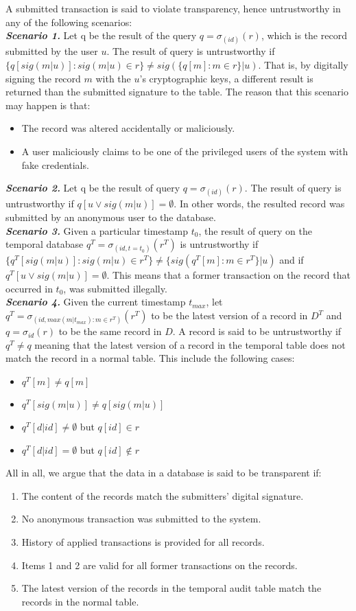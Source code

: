 A submitted transaction is said to violate transparency, hence untrustworthy in any of the following scenarios:\\
\textbf{\emph{Scenario 1.}} Let q be the result of the query $q=\sigma_{(id)}(r)$, which is the record submitted by the user $u$. The result of query is untrustworthy if $\{q[sig(m|u)]: sig(m|u) \in r\} \neq sig(\{q[m]: m \in r \} |u)$. That is, by digitally signing the record $m$ with the $u$'s cryptographic keys, a different result is returned than the submitted signature to the table. The reason that this scenario may happen is that: 
\begin{itemize}
	\item  The record was altered accidentally or maliciously.
	\item  A user maliciously claims to be one of the privileged users of the system with fake credentials.
\end{itemize} 
\textbf{\emph{Scenario 2.}} Let q be the result of query $q=\sigma_{(id)}(r)$. The result of query is untrustworthy if $q[u \vee sig(m|u)] = \emptyset$. In other words, the resulted record was submitted by an anonymous user to the database.\\
\textbf{\emph{Scenario 3.}} Given a particular timestamp $t_0$, the result of query on the temporal database  $q^T=\sigma_{(id,t=t_0)}(r^T)$ is untrustworthy if $\{q^T[sig(m|u)]: sig(m|u) \in r^T\} \neq \{sig(q^T[m]:m \in r^T\}|u)$ and if $q^T[u \vee sig(m|u)] = \emptyset$. This means that a former transaction on the record that occurred in $t_0$, was submitted illegally. \\
\textbf{\emph{Scenario 4.}} Given the current timestamp $t_{max}$, let $q^T = \sigma _{(id,max(m|t_{max}): m \in r^T)}(r^T)$ to be the latest version of a record in $D^T$ and $q=\sigma_{id}(r)$ to be the same record in $D$. A record is said to be untrustworthy if $q^T \neq q$ meaning that the latest version of a record in the temporal table does not match the record in a normal table. This include the following cases:
\begin{itemize}
	\item $q^T[m] \neq q[m]$
	\item $q^T[sig(m|u)] \neq q[sig(m|u)]$
	\item $q^T[d|id] \neq \emptyset$ but $q[id] \in r$
	\item $q^T[d|id] = \emptyset$ but $q[id] \notin r$
\end{itemize}


All in all, we argue that the data in a database is said to be transparent if:
\begin{enumerate}
	\item The content of the records match the submitters' digital signature.
	\item No anonymous transaction was submitted to the system.
	\item History of applied transactions is provided for all records. 
	\item Items 1 and 2 are valid for all former transactions on the records.
	\item The latest version of the records in the temporal audit table match the records in the normal table.
\end{enumerate}
